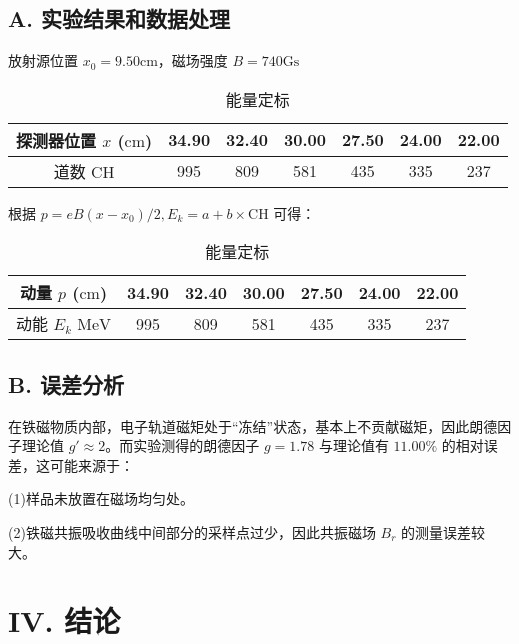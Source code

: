\documentclass[aps,prl,preprint,groupedaddress]{revtex4-2}
\begin{document}
\subsection{A. 实验结果和数据处理}

放射源位置 $x_0=9.50\mathrm{cm}$，磁场强度 $B=740\mathrm{Gs}$

\begin{table}[htbp] %
	\centering %
	\caption{能量定标} %
	\begin{tabular}{|c|c|c|c|c|c|c|} %
	\hline %
	探测器位置 $x$ ($\mathrm{cm}$) &34.90  &32.40 &30.00 &27.50 &24.00 &22.00  \\ %
	\hline %
	道数 $\mathrm{CH }$ &995 &809 &581 &435 &335 &237\\ %
	\hline %
	\end{tabular}
\end{table}

根据 $p=eB(x-x_0)/2,E_k=a+b\times\mathrm{CH}$ 可得：

\begin{table}[htbp] %
	\centering %
	\caption{能量定标} %
	\begin{tabular}{|c|c|c|c|c|c|c|} %
	\hline %
	动量 $p$ ($\mathrm{cm}$) &34.90  &32.40 &30.00 &27.50 &24.00 &22.00  \\ %
	\hline %
	动能 $E_k$ $\mathrm{MeV }$ &995 &809 &581 &435 &335 &237\\ %
	\hline %
	\end{tabular}
\end{table}

\subsection{B. 误差分析}

在铁磁物质内部，电子轨道磁矩处于“冻结”状态，基本上不贡献磁矩，因此朗德因子理论值 $g'\approx 2$。而实验测得的朗德因子 $g=1.78$ 与理论值有 $11.00\%$ 的相对误差，这可能来源于：

(1)样品未放置在磁场均匀处。

(2)铁磁共振吸收曲线中间部分的采样点过少，因此共振磁场 $B_r$ 的测量误差较大。

\section{IV. 结论}
\end{document}
